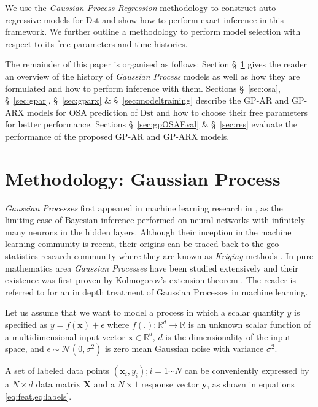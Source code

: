 We use the \emph{Gaussian Process Regression} methodology to construct auto-regressive models for $ \mathrm{Dst}$ and show how to perform exact inference in this framework. We further outline a methodology to perform model selection with respect to its free parameters and time histories.

The remainder of this paper is organised as follows: Section \S~\ref{sec:osaGPmethod} gives the reader an overview of the history of \emph{Gaussian Process} models as well as how they are formulated and how to perform inference with them. Sections \S~\ref{sec:osa}, \S~\ref{sec:gpar}, \S~\ref{sec:gparx} \& \S~\ref{sec:modeltraining} describe the GP-AR 
and GP-ARX models for OSA prediction of $\mathrm{Dst}$ and how to choose their free parameters for better performance. Sections \S~\ref{sec:gpOSAEval} \& \S~\ref{sec:res} evaluate the performance of the proposed GP-AR and GP-ARX models.

\section{Methodology: Gaussian Process} \label{sec:osaGPmethod}

\emph{Gaussian Processes} first appeared in machine learning research in \citet{Neal:1996:BLN:525544}, as the limiting case of Bayesian inference performed on neural networks with infinitely many neurons in the hidden layers. Although their inception in the machine learning community is recent, their origins can be traced back to the geo-statistics research community where they are known as \emph{Kriging} methods 
\citep{krige1951statistical}. In pure mathematics area \emph{Gaussian Processes} have been studied extensively and their existence was first proven by Kolmogorov's extension theorem \citep{tao2011introduction}. 
The reader is referred to \citet{Rasmussen:2005:GPM:1162254} for an in depth treatment of Gaussian Processes in machine learning.

Let us assume that we want to model a process in which a scalar quantity $y$ is specified as $y = f(\mathbf{x}) + \epsilon$ where   $f(.): \mathbb{R}^d \rightarrow \mathbb{R}$ is an unknown scalar function of a multidimensional input vector $\mathbf{x} \in \mathbb{R}^d$, $d$ is the dimensionality of the input space, and $\epsilon \sim \mathcal{N}(0, \sigma^2)$ is zero mean Gaussian noise with variance $\sigma^2$.

A set of labeled data points ${(\mathbf{x}_i, y_i); i = 1 \cdots N}$ can be conveniently expressed by a $N \times d$ data matrix $\mathbf{X}$ and a $N \times 1$ response vector $\mathbf{y}$, as shown in equations 
\cref{eq:feat,eq:labels}.

